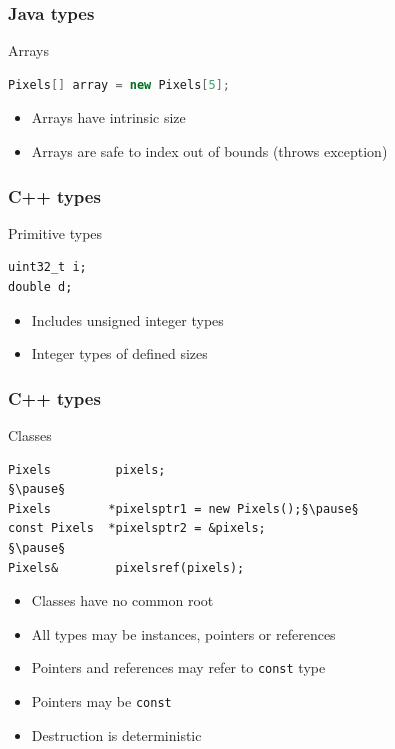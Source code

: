 \documentclass[handout]{beamer}
\begin{document}
\begin{frame}[fragile]
  \frametitle{Java types}
  \begin{block}{Arrays}
    \begin{lstlisting}[language=Java]
Pixels[] array = new Pixels[5];
\end{lstlisting}
    \begin{itemize}
      \pause
    \item Arrays have intrinsic size
      \pause
    \item Arrays are safe to index out of bounds (throws exception)
    \end{itemize}
  \end{block}
\end{frame}

\begin{frame}[fragile]
  \frametitle{C++ types}
  \begin{block}{Primitive types}
    \begin{lstlisting}
uint32_t i;
double d;
\end{lstlisting}
    \begin{itemize}
      \pause
    \item Includes unsigned integer types
      \pause
    \item Integer types of defined sizes
    \end{itemize}
  \end{block}
\end{frame}

\begin{frame}[fragile]
  \frametitle{C++ types}
  \begin{block}{Classes}
  \begin{lstlisting}
Pixels         pixels;
§\pause§
Pixels        *pixelsptr1 = new Pixels();§\pause§
const Pixels  *pixelsptr2 = &pixels;
§\pause§
Pixels&        pixelsref(pixels);
\end{lstlisting}
  \begin{itemize}
    \pause
  \item Classes have no common root
    \pause
  \item All types may be instances, pointers or references
    \pause
  \item Pointers and references may refer to \texttt{const} type
    \pause
  \item Pointers may be \texttt{const}
    \pause
  \item Destruction is deterministic
  \end{itemize}
  \end{block}
\end{frame}
\end{document}
